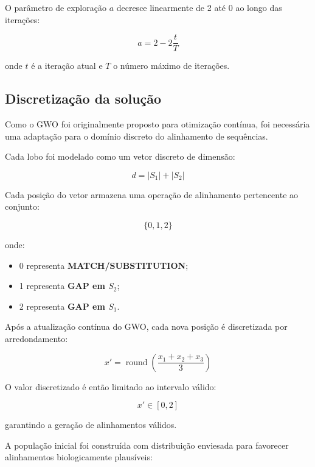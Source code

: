 \documentclass[12pt]{article}
\begin{document}
O parâmetro de exploração $a$ decresce linearmente de 2 até 0 ao longo das iterações:

\begin{equation}
    a = 2 - 2\frac{t}{T}
\end{equation}

onde $t$ é a iteração atual e $T$ o número máximo de iterações.

\subsection{Discretização da solução}

Como o GWO foi originalmente proposto para otimização contínua, foi necessária uma adaptação para o domínio discreto do alinhamento de sequências.

Cada lobo foi modelado como um vetor discreto de dimensão:

\begin{equation}
    d = |S_1| + |S_2|
\end{equation}


Cada posição do vetor armazena uma operação de alinhamento pertencente ao conjunto:

\begin{equation}
    \{0,1,2\}
\end{equation}


onde:

\begin{itemize}
    \item 0 representa \textbf{MATCH/SUBSTITUTION};
    \item 1 representa \textbf{GAP em $S_2$};
    \item 2 representa \textbf{GAP em $S_1$}.
\end{itemize}

Após a atualização contínua do GWO, cada nova posição é discretizada por arredondamento:

\begin{equation}
    x' = \operatorname{round}\left(\frac{x_1 + x_2 + x_3}{3}\right)
\end{equation}

O valor discretizado é então limitado ao intervalo válido:

\begin{equation}
    x' \in [0,2]
\end{equation}

garantindo a geração de alinhamentos válidos.

A população inicial foi construída com distribuição enviesada para favorecer alinhamentos biologicamente plausíveis:
\end{document}
